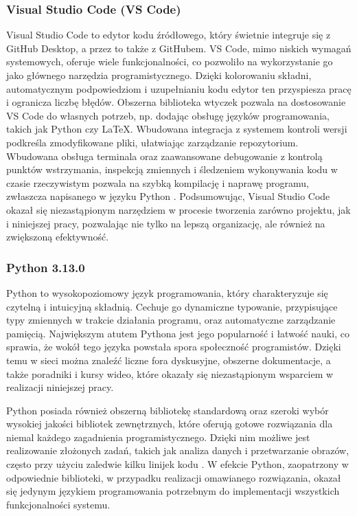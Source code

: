 \documentclass[a4paper,twoside,12pt]{book}
\begin{document}
\subsubsection{Visual Studio Code (VS Code)}

Visual Studio Code to edytor kodu źródłowego, który świetnie integruje się z GitHub Desktop, a przez to także z GitHubem. VS Code, mimo niskich wymagań systemowych, oferuje wiele funkcjonalności, co pozwoliło na wykorzystanie go jako głównego narzędzia programistycznego. Dzięki kolorowaniu składni, automatycznym podpowiedziom i uzupełnianiu kodu edytor ten przyspiesza pracę i ogranicza liczbę błędów. Obszerna biblioteka wtyczek pozwala na dostosowanie VS Code do własnych potrzeb, np. dodając obsługę języków programowania, takich jak Python czy \LaTeX. Wbudowana integracja z systemem kontroli wersji podkreśla zmodyfikowane pliki, ułatwiając zarządzanie repozytorium. Wbudowana obsługa terminala oraz zaawansowane debugowanie z kontrolą punktów wstrzymania, inspekcją zmiennych i śledzeniem wykonywania kodu w czasie rzeczywistym pozwala na szybką kompilację i naprawę programu, zwłaszcza napisanego w języku Python \cite{bib:VSCode-Essentials}. Podsumowując, Visual Studio Code okazał się niezastąpionym narzędziem w procesie tworzenia zarówno projektu, jak i niniejszej pracy, pozwalając nie tylko na lepszą organizację, ale również na zwiększoną efektywność.

\subsubsection{Python 3.13.0}

Python to wysokopoziomowy język programowania, który charakteryzuje się czytelną i intuicyjną składnią. Cechuje go dynamiczne typowanie, przypisujące typy zmiennych w trakcie działania programu, oraz automatyczne zarządzanie pamięcią. Największym atutem Pythona jest jego popularność i łatwość nauki, co sprawia, że wokół tego języka powstała spora społeczność programistów. Dzięki temu w sieci można znaleźć liczne fora dyskusyjne, obszerne dokumentacje, a także poradniki i kursy wideo, które okazały się niezastąpionym wsparciem w realizacji niniejszej pracy.

Python posiada również obszerną bibliotekę standardową oraz szeroki wybór wysokiej jakości bibliotek zewnętrznych, które oferują gotowe rozwiązania dla niemal każdego zagadnienia programistycznego. Dzięki nim możliwe jest realizowanie złożonych zadań, takich jak analiza danych i przetwarzanie obrazów, często przy użyciu zaledwie kilku linijek kodu \cite{bib:Python-a-byte}. W efekcie Python, zaopatrzony w odpowiednie biblioteki, w przypadku realizacji omawianego rozwiązania, okazał się jedynym językiem programowania potrzebnym do implementacji wszystkich funkcjonalności systemu.
\end{document}
